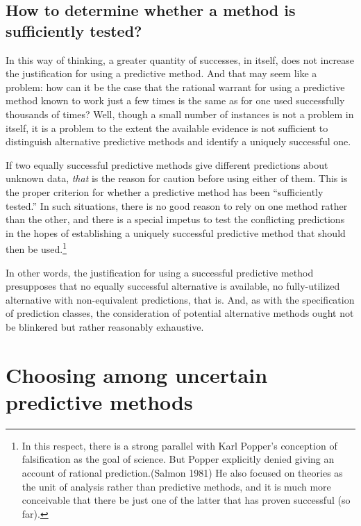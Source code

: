 \documentclass[
  letterpaper,
  DIV=11,
  numbers=noendperiod]{scrartcl}
\theoremstyle{definition}
\theoremstyle{remark}
\begin{document}
\subsection{How to determine whether a method is sufficiently
tested?}\label{sec-multi}

In this way of thinking, a greater quantity of successes, in itself,
does not increase the justification for using a predictive method. And
that may seem like a problem: how can it be the case that the rational
warrant for using a predictive method known to work just a few times is
the same as for one used successfully thousands of times? Well, though a
small number of instances is not a problem in itself, it is a problem to
the extent the available evidence is not sufficient to distinguish
alternative predictive methods and identify a uniquely successful one.

If two equally successful predictive methods give different predictions
about unknown data, \emph{that} is the reason for caution before using
either of them. This is the proper criterion for whether a predictive
method has been ``sufficiently tested.'' In such situations, there is no
good reason to rely on one method rather than the other, and there is a
special impetus to test the conflicting predictions in the hopes of
establishing a uniquely successful predictive method that should then be
used.\footnote{In this respect, there is a strong parallel with Karl
  Popper's conception of falsification as the goal of science. But
  Popper explicitly denied giving an account of rational
  prediction.(Salmon 1981) He also focused on theories as the unit of
  analysis rather than predictive methods, and it is much more
  conceivable that there be just one of the latter that has proven
  successful (so far).}

In other words, the justification for using a successful predictive
method presupposes that no equally successful alternative is available,
no fully-utilized alternative with non-equivalent predictions, that is.
And, as with the specification of prediction classes, the consideration
of potential alternative methods ought not be blinkered but rather
reasonably exhaustive.

\section{Choosing among uncertain predictive methods}\label{sec-prob}
\end{document}

